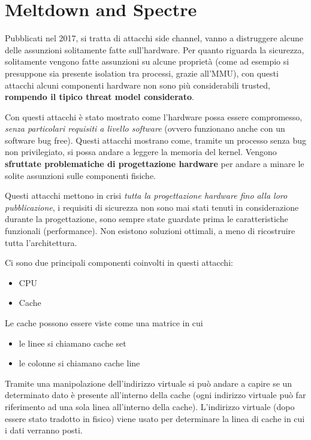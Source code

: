 \section{Meltdown and Spectre}

Pubblicati nel 2017, si tratta di attacchi side channel, vanno a distruggere alcune delle assunzioni solitamente fatte sull'hardware. Per quanto riguarda la sicurezza, solitamente vengono fatte assunzioni su alcune proprietà (come ad esempio si presuppone sia presente isolation tra processi, grazie all'MMU), con questi attacchi alcuni componenti hardware non sono più considerabili trusted, \textbf{rompendo il tipico threat model considerato}.

Con questi attacchi è stato mostrato come l'hardware possa essere compromesso, \textit{senza particolari requisiti a livello software} (ovvero funzionano anche con un software bug free). Questi attacchi mostrano come, tramite un processo senza bug non privilegiato, si possa andare a leggere la memoria del kernel. Vengono \textbf{sfruttate problematiche di progettazione hardware} per andare a minare le solite assunzioni sulle componenti fisiche.

Questi attacchi mettono in crisi \textit{tutta la progettazione hardware fino alla loro pubblicazione}, i requisiti di sicurezza non sono mai stati tenuti in considerazione durante la progettazione, sono sempre state guardate prima le caratteristiche funzionali (performance). Non esistono soluzioni ottimali, a meno di ricostruire tutta l'architettura.

Ci sono due principali componenti coinvolti in questi attacchi: 
\begin{itemize}
	\item CPU
    
	\item Cache
\end{itemize}

Le cache possono essere viste come una matrice in cui
\begin{itemize}
	\item le linee si chiamano cache set
	
    \item le colonne si chiamano cache line
\end{itemize}

Tramite una manipolazione dell'indirizzo virtuale si può andare a capire se un determinato dato è presente all'interno della cache (ogni indirizzo virtuale può far riferimento ad una sola linea all'interno della cache). L'indirizzo virtuale (dopo essere stato tradotto in fisico) viene usato per determinare la linea di cache in cui i dati verranno posti. 

